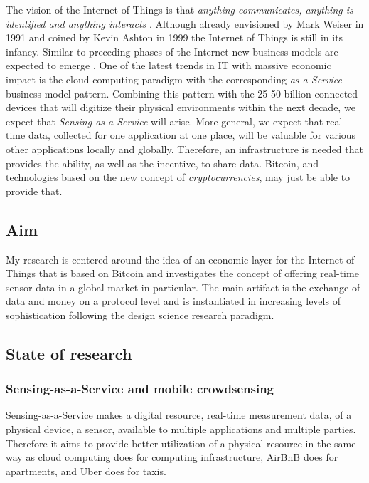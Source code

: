 \documentclass[a4paper, 12pt]{scrartcl}
\begin{document}
The vision of the Internet of Things is that \textit{anything communicates, anything is identified and anything interacts} \parencite{Miorandi2012}.
Although already envisioned by Mark Weiser in 1991 \parencite{weiser1991computer} and coined by Kevin Ashton in 1999 \parencite{ashton2009internet} the Internet of Things is still in its infancy. Similar to preceding phases of the Internet new business models are expected to emerge \parencite{fleisch2014business}. One of the latest trends in IT with massive economic impact is the cloud computing paradigm \parencite{Armbrust:2010:VCC:1721654.1721672} with the corresponding \textit{as a Service} \parencite{10.1109/MC.2011.67} business model pattern. Combining this pattern with the 25-50 billion connected devices that will digitize their physical environments within the next decade, we expect that \textit{Sensing-as-a-Service} will arise. More general, we expect that real-time data, collected for one application at one place, will be valuable for various other applications locally and globally. Therefore, an infrastructure is needed that provides the ability, as well as the incentive, to share data. Bitcoin, and technologies based on the new concept of \textit{cryptocurrencies}, may just be able to provide that. 

\subsection{Aim}
My research is centered around the idea of an economic layer for the Internet of Things that is based on Bitcoin and investigates the concept of offering real-time sensor data in a global market in particular. The main artifact is the exchange of data and money on a protocol level and is instantiated in increasing levels of sophistication following the design science research paradigm.

\subsection{State of research}

\subsubsection{Sensing-as-a-Service and mobile crowdsensing}
Sensing-as-a-Service makes a digital resource, real-time measurement data, of a physical device, a sensor, available to multiple applications and multiple parties. Therefore it aims to provide better utilization of a physical resource in the same way as cloud computing does for computing infrastructure, AirBnB does for apartments, and Uber does for taxis.
 
\end{document}
